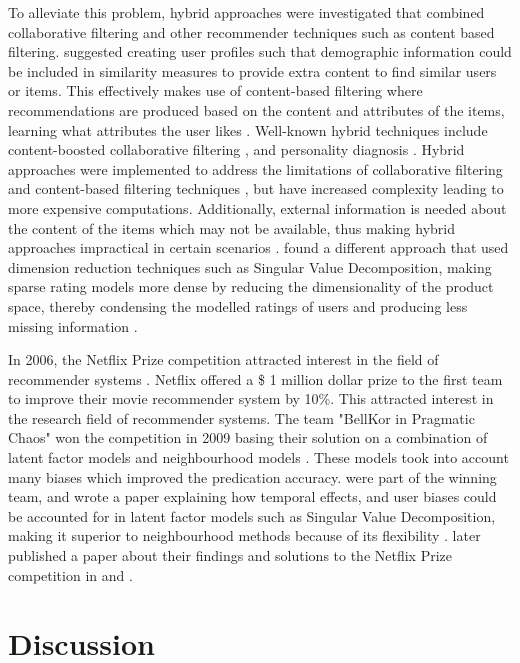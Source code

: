To alleviate this problem, hybrid approaches were investigated that combined collaborative filtering and other recommender techniques such as content based filtering. \citeauthor{toward} suggested creating user profiles such that demographic information could be included in similarity measures to provide extra content to find similar users or items. This effectively makes use of content-based filtering where recommendations are produced based on the content and attributes of the items, learning what attributes the user likes \cite{toward}. Well-known hybrid techniques include content-boosted collaborative filtering \cite{hybrid}, and personality diagnosis \cite{hybrid2, survey}. Hybrid approaches were implemented to address the limitations of collaborative filtering and content-based filtering techniques \cite{toward}, but have increased complexity leading to more expensive computations. Additionally, external information is needed about the content of the items which may not be available, thus making hybrid approaches impractical in certain scenarios \cite{survey}. \citeauthor{dimension} found a different approach that used dimension reduction techniques such as Singular Value Decomposition, making sparse rating models more dense by reducing the dimensionality of the product space, thereby condensing the modelled ratings of users and producing less missing information \cite{dimension}. 

In 2006, the Netflix Prize competition attracted interest in the field of recommender systems \cite{survey}. Netflix offered a \$ 1 million dollar prize to the first team to improve their movie recommender system by 10\%. This attracted interest in the research field of recommender systems. The team "BellKor in Pragmatic Chaos" won the competition in 2009 basing their solution on a combination of latent factor models and neighbourhood models \cite{winning, survey}. These models took into account many biases which improved the predication accuracy. \citeauthor{koren2009matrix} were part of the winning team, and wrote a paper explaining how temporal effects, and user biases could be accounted for in latent factor models such as Singular Value Decomposition, making it superior to neighbourhood methods because of its flexibility \cite{koren2009matrix}. \citeauthor{koren2011} later published a paper about their findings and solutions to the Netflix Prize competition in \cite{koren2011} and \cite{winners}.


\section{Discussion}

